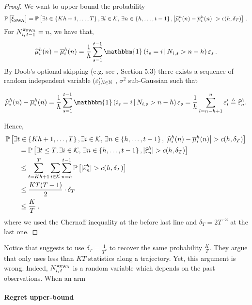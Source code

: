\begin{proof}
We want to upper bound the probability
\[
\PP{\bar{\HPevent}_{\rm SWA}} = \PP{\exists t \in \left\{Kh +1, \dots, T\right\},\exists i \in \arms,\,\exists n\in \left\{h, \dots, t-1\right\}, \big| \hmu_i^h(n) - \bmu_i^h(n)\big|>c(h,\delta_T) }\,.
\]
For $N_{i,\,t-1}^{\pi_{\rm SWA}} = n$, we have that, 
\[
 \hmu_i^h(n) - \bmu_i^h(n)= \frac{1}{h} \sum_{s=1}^{t-1}\mathbbm{1}\pa{i_s = i \, |\, N_{i,s}> n - h }\epsilon_s\,.
\]
By Doob's optional skipping (e.g. see \citet{chow1997probability}, Section 5.3) there exists a sequence of random independent variable $(\varepsilon'_l)_{l\in{\mathbb N}}$ , $\sigma^2$ sub-Gaussian such that 

\[\hmu_i^h(n) - \bmu_i^h(n)= \frac{1}{h} \sum_{s=1}^{t-1}\mathbbm{1}\pa{i_s = i \, |\, N_{i,s}> n - h }\epsilon_s=  \frac{1}{h} \sum_{l=n-h+1}^n \epsilon'_l \triangleq \hepsilon^h_n. \]

Hence, 
\begin{align*}
    &\PP{\exists t \in \left\{Kh +1, \dots, T\right\},\exists i \in \arms,\,\exists n \in \left\{h, \dots, t-1\right\}, \big| \hmu_i^h(n) - \bmu_i^h(n)\big|>c(h,\delta_T) }\\
    &\qquad= \PP{\exists t\leq T,\exists i \in \arms,\,\exists n \in \left\{h, \dots, t-1\right\},|\hepsilon^h_n|>c(h,\delta_T) }\\
    &\qquad\leq \sum_{t=Kh + 1}^{T}\sum_{i \in \arms} \sum_{n=h}^{t-1} \PP{|\hepsilon^h_n|>c(h,\delta_T)} \\
    &\qquad\leq  \frac{KT(T-1)}{2}\cdot \delta_T  \\
    &\qquad \leq \frac{K}{T}\,,
\end{align*}
where we used the Chernoff inequality at the before last line and $\delta_{T} = 2T^{-3}$ at the last one. 
\end{proof}

\begin{remark}
\label{rem:uncorrect-levine}
Notice that \citet{levine2017rotting} suggests to use $\delta_T = \frac{1}{T^2}$ to recover the same probability $\frac{K}{T}$. They argue that \SWA only uses less than $KT$ statistics along a trajectory. Yet, this argument is wrong. Indeed, $N_{i,\,t}^{\pi_{\rm SWA}}$ is a random variable which depends on the past observations. When an arm  %
\end{remark}


 
\paragraph{Regret upper-bound}

